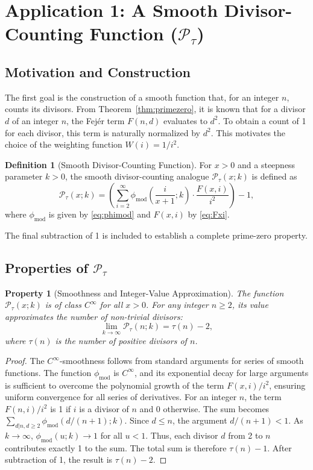 \documentclass[11pt,a4paper]{amsart}
\newcommand{\Px}{\mathcal{P}}
\theoremstyle{plain}
\newtheorem{property}[theorem]{Property}
\theoremstyle{definition}
\newtheorem{definition}[theorem]{Definition}
\begin{document}
\section{Application 1: A Smooth Divisor-Counting Function (\texorpdfstring{$\Px_{\tau}$}{P_tau})}

\subsection{Motivation and Construction}
The first goal is the construction of a smooth function that, for an integer $n$, counts its divisors.
From Theorem~\ref{thm:primezero}, it is known that for a divisor $d$ of an integer $n$, the Fejér term $F(n,d)$ evaluates to $d^2$.
To obtain a count of 1 for each divisor, this term is naturally normalized by $d^2$.
This motivates the choice of the weighting function $W(i) = 1/i^2$.
\begin{definition}[Smooth Divisor-Counting Function]
For $x>0$ and a steepness parameter $k>0$, the smooth divisor-counting analogue $\Px_{\tau}(x; k)$ is defined as
\begin{equation}\label{eq:Ptau}
\Px_{\tau}(x; k) = \left( \sum_{i=2}^{\infty} \phi_{\text{mod}}\left(\frac{i}{x+1}; k\right) \cdot \frac{F(x,i)}{i^2} \right) - 1,
\end{equation}
where $\phi_{\text{mod}}$ is given by \eqref{eq:phimod} and $F(x,i)$ by \eqref{eq:Fxi}.
\end{definition}
The final subtraction of 1 is included to establish a complete prime-zero property.
\subsection{Properties of $\Px_{\tau}$}

\begin{property}[Smoothness and Integer-Value Approximation]
The function $\Px_{\tau}(x;k)$ is of class $C^\infty$ for all $x>0$.
For any integer $n\ge2$, its value approximates the number of non-trivial divisors:
\[ \lim_{k\to\infty} \Px_{\tau}(n; k) = \tau(n)-2, \]
where $\tau(n)$ is the number of positive divisors of $n$.
\end{property}
\begin{proof}
The $C^\infty$-smoothness follows from standard arguments for series of smooth functions.
The function $\phi_{\text{mod}}$ is $C^\infty$, and its exponential decay for large arguments is sufficient to overcome the polynomial growth of the term $F(x,i)/i^2$, ensuring uniform convergence for all series of derivatives.
For an integer $n$, the term $F(n,i)/i^2$ is 1 if $i$ is a divisor of $n$ and 0 otherwise.
The sum becomes $\sum_{d|n, d\ge2} \phi_{\text{mod}}(d/(n+1);k)$. Since $d \le n$, the argument $d/(n+1) < 1$.
As $k\to\infty$, $\phi_{\text{mod}}(u;k) \to 1$ for all $u<1$. Thus, each divisor $d$ from 2 to $n$ contributes exactly 1 to the sum.
The total sum is therefore $\tau(n)-1$. After subtraction of 1, the result is $\tau(n)-2$.
\end{proof}
\end{document}
